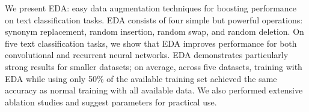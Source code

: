 We present EDA: easy data augmentation techniques for boosting performance on text classification tasks. EDA consists of four simple but powerful operations: synonym replacement, random insertion, random swap, and random deletion. On five text classification tasks, we show that EDA improves performance for both convolutional and recurrent neural networks. EDA demonstrates particularly strong results for smaller datasets; on average, across five datasets, training with EDA while using only 50\% of the available training set achieved the same accuracy as normal training with all available data. We also performed extensive ablation studies and suggest parameters for practical use.
